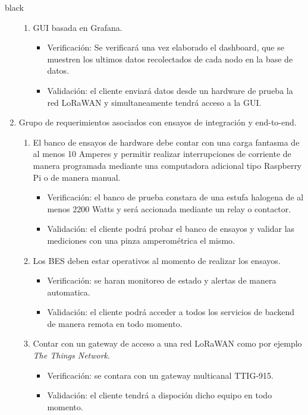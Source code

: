 \documentclass[11pt]{charter}
\begin{document}
\begin{consigna}{black}
\begin{enumerate}
\begin{enumerate}[label*=\arabic*.]
			\item GUI basada en Grafana.
			\begin{itemize}
				\item Verificación: Se verificará una vez elaborado el dashboard, que se muestren los ultimos datos recolectados de cada nodo en la base de datos.\\
				\item Validación: el cliente enviará datos desde un hardware de prueba la red LoRaWAN y simultaneamente tendrá acceso a la GUI.\\
			\end{itemize}
		\end{enumerate}
		
	\item Grupo de requerimientos asociados con ensayos de integración y end-to-end.
		\begin{enumerate}[label*=\arabic*.]
			\item El banco de ensayos de hardware debe contar con una carga fantasma de al menos
			10 Amperes y permitir realizar interrupciones de corriente de manera programada
			mediante una computadora adicional tipo Raspberry Pi o de manera manual.
			\begin{itemize}
				\item Verificación: el banco de prueba constara de una estufa halogena de al menos 2200 Watts y será accionada mediante un relay o contactor.\\
				\item Validación: el cliente podrá probar el banco de ensayos y validar las mediciones con una pinza amperométrica el mismo.\\
			\end{itemize}
			
			\item Los BES deben estar operativos al momento de realizar los ensayos.
			\begin{itemize}
				\item Verificación: se haran monitoreo de estado y alertas de manera automatica.\\
				\item Validación: el cliente podrá acceder a todos los servicios de backend de manera remota en todo momento.\\
			\end{itemize}
			
			\item Contar con un gateway de acceso a una red LoRaWAN como por ejemplo \textit{The Things Network}.
			\begin{itemize}
				\item Verificación: se contara con un gateway multicanal TTIG-915.\\
				\item Validación: el cliente tendrá a dispoción dicho equipo en todo momento.\\
			\end{itemize}
		\end{enumerate}
\end{enumerate}

\end{consigna}
\end{document}

